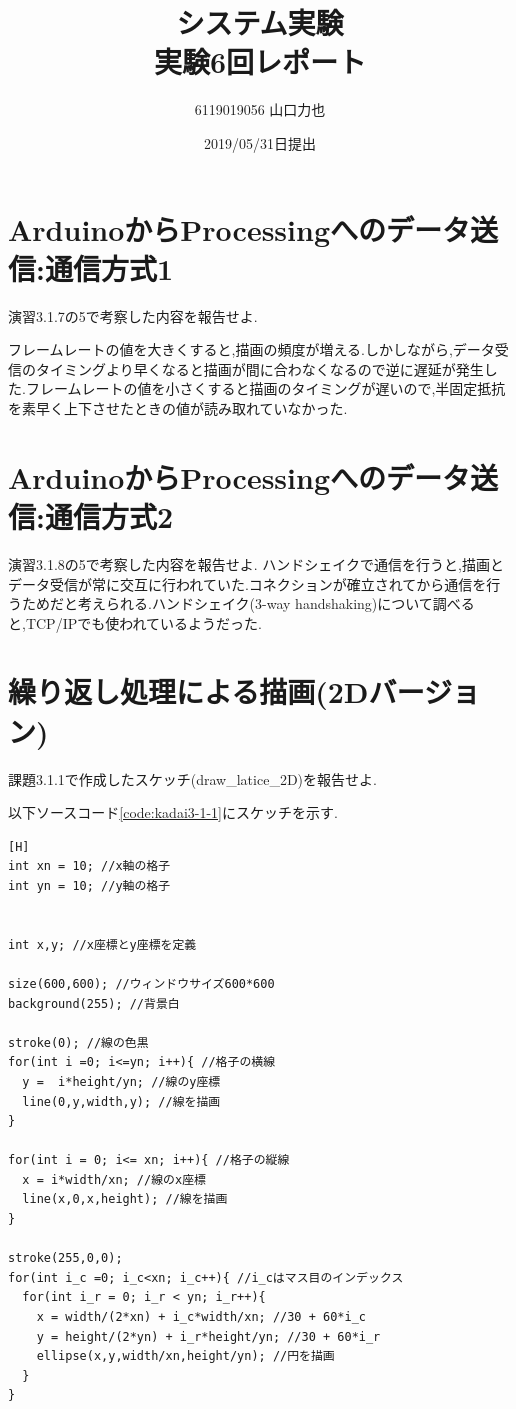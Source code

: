 \documentclass{jarticle}
\title{{システム実験}\\実験6回レポート}
\author{6119019056 山口力也}
\date{2019/05/31日提出}
\begin{document}
\maketitle

\section{ArduinoからProcessingへのデータ送信:通信方式1}
演習3.1.7の5で考察した内容を報告せよ.

フレームレートの値を大きくすると,描画の頻度が増える.しかしながら,データ受信のタイミングより早くなると描画が間に合わなくなるので逆に遅延が発生した.フレームレートの値を小さくすると描画のタイミングが遅いので,半固定抵抗を素早く上下させたときの値が読み取れていなかった.

\section{ArduinoからProcessingへのデータ送信:通信方式2}
演習3.1.8の5で考察した内容を報告せよ.
ハンドシェイクで通信を行うと,描画とデータ受信が常に交互に行われていた.コネクションが確立されてから通信を行うためだと考えられる.ハンドシェイク(3-way handshaking)について調べると,TCP/IPでも使われているようだった.
\section{繰り返し処理による描画(2Dバージョン)}
課題3.1.1で作成したスケッチ(draw\_latice\_2D)を報告せよ.

以下ソースコード\ref{code:kadai3-1-1}にスケッチを示す.

\begin{lstlisting}[caption = 課題3.1.1,label=code:kadai3-1-1][H]
int xn = 10; //x軸の格子
int yn = 10; //y軸の格子


int x,y; //x座標とy座標を定義

size(600,600); //ウィンドウサイズ600*600
background(255); //背景白

stroke(0); //線の色黒
for(int i =0; i<=yn; i++){ //格子の横線
  y =  i*height/yn; //線のy座標
  line(0,y,width,y); //線を描画
}

for(int i = 0; i<= xn; i++){ //格子の縦線
  x = i*width/xn; //線のx座標
  line(x,0,x,height); //線を描画
}

stroke(255,0,0);
for(int i_c =0; i_c<xn; i_c++){ //i_cはマス目のインデックス
  for(int i_r = 0; i_r < yn; i_r++){
    x = width/(2*xn) + i_c*width/xn; //30 + 60*i_c
    y = height/(2*yn) + i_r*height/yn; //30 + 60*i_r
    ellipse(x,y,width/xn,height/yn); //円を描画
  }
}
\end{lstlisting}
\end{document}
